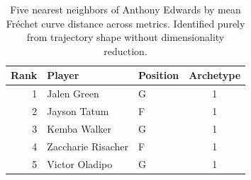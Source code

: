 \begin{table}[htbp]
  \centering\small
  \begin{tabular}{rllc}
    \toprule
    Rank & Player & Position & Archetype \\
    \midrule
    1 & Jalen Green & G & 1 \\
    2 & Jayson Tatum & F & 1 \\
    3 & Kemba Walker & G & 1 \\
    4 & Zaccharie Risacher & F & 1 \\
    5 & Victor Oladipo & G & 1 \\
    \bottomrule
  \end{tabular}
  \caption{Five nearest neighbors of Anthony Edwards by mean Fr\'{e}chet curve distance across metrics. Identified purely from trajectory shape without dimensionality reduction.}
  \label{tab:Anthony_Edwards_frechet_curve_neighbors}
\end{table}

